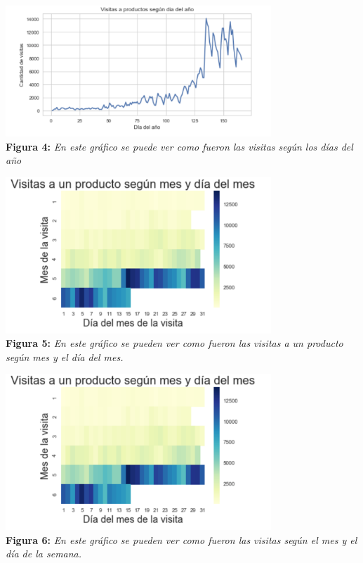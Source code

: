 \documentclass[titlepage,a4paper]{article}
\begin{document}
	\begin{center}
	\includegraphics[width=10cm]{VisitasAProductosSegunDiaAnio.jpg}\\
	\textbf{Figura 4:}  \textit{En este gráfico se puede ver como fueron las visitas según los días del año  }
	\end{center}

	\begin{center}
	\includegraphics[width=10cm]{visitasSegunmesDiaMes.jpg}\\
	\textbf{Figura 5:}  \textit{En este gráfico se pueden ver como fueron las visitas a un producto según mes y el día del mes.   }
	
	\end{center}
	\begin{center}
	\includegraphics[width=10cm]{visitasSegunmesDiaSemana.jpg}\\
	\textbf{Figura 6:}  \textit{En este gráfico se pueden ver como fueron las visitas según el mes y el día de la semana.    }
	\end{center}
	

	
	
	
	
\end{document}
